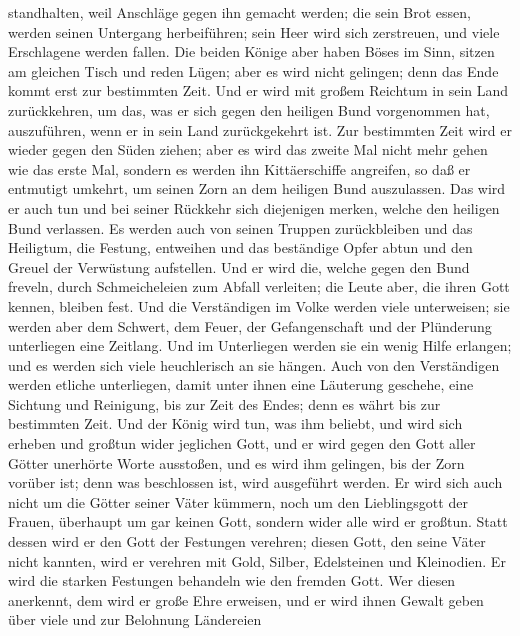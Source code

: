 standhalten, weil Anschläge gegen ihn gemacht werden; 
die sein Brot essen, werden seinen Untergang herbeiführen; sein Heer
wird sich zerstreuen, und viele Erschlagene werden fallen.
 Die beiden Könige aber haben Böses im Sinn, sitzen am
gleichen Tisch und reden Lügen; aber es wird nicht gelingen; denn das
Ende kommt erst zur bestimmten Zeit.  Und er wird mit
großem Reichtum in sein Land zurückkehren, um das, was er sich gegen den
heiligen Bund vorgenommen hat, auszuführen, wenn er in sein Land
zurückgekehrt ist.  Zur bestimmten Zeit wird er wieder
gegen den Süden ziehen; aber es wird das zweite Mal nicht mehr gehen wie
das erste Mal,  sondern es werden ihn Kittäerschiffe
angreifen, so daß er entmutigt umkehrt, um seinen Zorn an dem heiligen
Bund auszulassen. Das wird er auch tun und bei seiner Rückkehr sich
diejenigen merken, welche den heiligen Bund verlassen. 
Es werden auch von seinen Truppen zurückbleiben und das Heiligtum, die
Festung, entweihen und das beständige Opfer abtun und den Greuel der
Verwüstung aufstellen.  Und er wird die, welche gegen den
Bund freveln, durch Schmeicheleien zum Abfall verleiten; die Leute aber,
die ihren Gott kennen, bleiben fest.  Und die
Verständigen im Volke werden viele unterweisen; sie werden aber dem
Schwert, dem Feuer, der Gefangenschaft und der Plünderung unterliegen
eine Zeitlang.  Und im Unterliegen werden sie ein wenig
Hilfe erlangen; und es werden sich viele heuchlerisch an sie hängen.
 Auch von den Verständigen werden etliche unterliegen,
damit unter ihnen eine Läuterung geschehe, eine Sichtung und Reinigung,
bis zur Zeit des Endes; denn es währt bis zur bestimmten Zeit.
 Und der König wird tun, was ihm beliebt, und wird sich
erheben und großtun wider jeglichen Gott, und er wird gegen den Gott
aller Götter unerhörte Worte ausstoßen, und es wird ihm gelingen, bis
der Zorn vorüber ist; denn was beschlossen ist, wird ausgeführt werden.
 Er wird sich auch nicht um die Götter seiner Väter
kümmern, noch um den Lieblingsgott der Frauen, überhaupt um gar keinen
Gott, sondern wider alle wird er großtun.  Statt dessen
wird er den Gott der Festungen verehren; diesen Gott, den seine Väter
nicht kannten, wird er verehren mit Gold, Silber, Edelsteinen und
Kleinodien.  Er wird die starken Festungen behandeln wie
den fremden Gott. Wer diesen anerkennt, dem wird er große Ehre erweisen,
und er wird ihnen Gewalt geben über viele und zur Belohnung Ländereien
